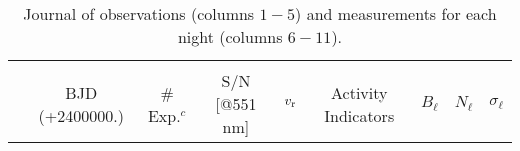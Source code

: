 \documentclass[a4paper,fleqn,usenatbib]{mnras}
\begin{document}
\begin{table*}
\caption{Journal of observations (columns $1-5$) and measurements for each night (columns $6-11$).}             
\label{table_2}      
\centering
\begin{threeparttable}
{\scriptsize       
\begin{tabular}{c c c c c c c c r r c}    
\hline\hline
& & & & & & & & &\\[-4pt]

& BJD (+2400000.) & \# Exp.$^{c}$ & \multicolumn{2}{c}{S/N [@551 nm]} & $v_{\rm r}$ & \multicolumn{2}{c}{Activity Indicators} & \multicolumn{1}{c}{$B_{\ell}$} & \multicolumn{1}{c}{$N_{\ell}$} & $\sigma_{\ell}$ \\[3pt]


\end{tabular}}
\end{threeparttable}
\end{table*}
\end{document}
